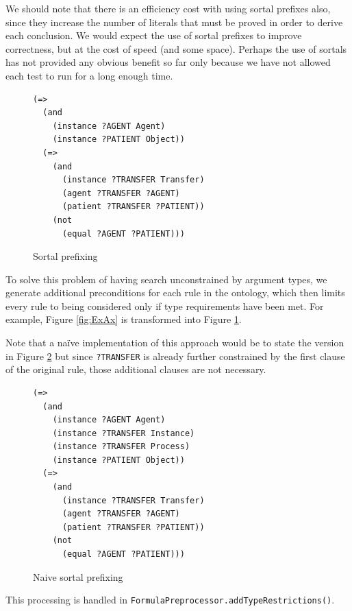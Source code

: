 \documentclass{book}
\begin{document}
We should note that there is an efficiency cost with using sortal prefixes also,
since they increase the number of literals that must be proved in order to
derive each conclusion.  We would expect the use of sortal prefixes to improve
correctness, but at the cost of speed (and some space).  Perhaps the use of
sortals has not provided any obvious benefit so far only because we have not
allowed each test to run for a long enough time.

\begin{figure}
\begin{framed}
\label{fig:SortPref}
\begin{verbatim}
(=>
  (and
    (instance ?AGENT Agent)
    (instance ?PATIENT Object))
  (=>
    (and
      (instance ?TRANSFER Transfer)
      (agent ?TRANSFER ?AGENT)
      (patient ?TRANSFER ?PATIENT))
    (not
      (equal ?AGENT ?PATIENT)))
\end{verbatim}
\caption{Sortal prefixing}
\end{framed}
\end{figure}

To solve this problem of having search unconstrained by argument types, we
generate additional preconditions for each rule in the ontology, which then
limits every rule to being considered only if type requirements have been met.
For example, Figure \ref{fig:ExAx} is transformed into Figure
\ref{fig:SortPref}.

Note that a naïve implementation of this approach would be to state the version
in Figure \ref{fig:NaiveSort} but since {\tt ?TRANSFER} is already further
constrained by the first clause of the original rule, those additional clauses
are not necessary.

\begin{figure}
\begin{framed}
\label{fig:NaiveSort}
\begin{verbatim}
(=>
  (and
    (instance ?AGENT Agent)
    (instance ?TRANSFER Instance)
    (instance ?TRANSFER Process)
    (instance ?PATIENT Object))
  (=>
    (and
      (instance ?TRANSFER Transfer)
      (agent ?TRANSFER ?AGENT)
      (patient ?TRANSFER ?PATIENT))
    (not
      (equal ?AGENT ?PATIENT)))
\end{verbatim}
\caption{Naive sortal prefixing}
\end{framed}
\end{figure}

This processing is handled in \texttt{FormulaPreprocessor.addTypeRestrictions()}.
\end{document}
